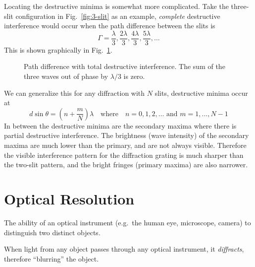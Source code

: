 Locating the destructive minima is somewhat more complicated. Take the
three-slit configuration in Fig.~\ref{fig:3-slit} as an example, \emph{complete}
destructive interference would occur when the path difference between the slits
is
\begin{equation*}
  \Gamma=\frac\lambda3, \frac{2\lambda}3,
  \frac{4\lambda}3, \frac{5\lambda}3,\ldots
\end{equation*}
This is shown graphically in Fig.~\ref{fig:grating-destructive}.
\begin{figure}[ht]
  \centering
  \caption{Path difference with total destructive interference. The sum of the
  three waves out of phase by $\lambda/3$ is zero.}
  \label{fig:grating-destructive}
\end{figure}

We can generalize this for any diffraction with $N$ slits, destructive minima
occur at
\begin{equation}
  d\sin\theta=
  \left(n+\frac mN\right)\lambda
  \quad\text{where}\quad n=0,1,2,\ldots \text{ and }m=1,...,N-1
  \label{grating-min}
\end{equation}
In between the destructive minima are the secondary maxima where there is
partial destructive interference. The brightness (wave intensity) of the
secondary maxima are much lower than the primary, and are not always visible.
Therefore the visible interference pattern for the diffraction grating is much
sharper than the two-slit pattern, and the bright fringes (primary maxima) are
also narrower.


\begin{figure}[ht]
  \centering
\end{figure}

\section{Optical Resolution}
The ability of an optical instrument (e.g.\ the human eye, microscope,
camera) to distinguish two distinct objects.
\begin{figure}[ht]
\end{figure}
When light from any object passes through any optical instrument, it
\emph{diffracts}, therefore ``blurring'' the object.




